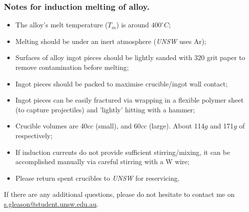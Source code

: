 \subsubsection{Notes for induction melting of \MgZnCa alloy.}
\begin{itemize}
\item The \MgZnCa alloy's melt temperature ($T_{m}$) is around $400^{\circ}C$;
\item Melting should be under an inert atmosphere (\textit{UNSW} uses Ar);
\item Surfaces of alloy ingot pieces should be lightly sanded with 320 grit paper to remove contamination before melting;
\item Ingot pieces should be packed to maximise crucible/ingot wall contact;
\item Ingot pieces can be easily fractured via wrapping in a flexible polymer sheet (to capture projectiles) and 'lightly' hitting with a hammer;
\item Crucible volumes are 40$cc$ (small), and 60$cc$ (large). About 114$g$ and 171$g$ of \MgZnCa respectively;
\item If induction currents do not provide sufficient stirring/mixing, it can be accomplished manually via careful stirring with a W wire; 
\item Please return spent crucibles to \textit{UNSW} for reservicing. 
\end{itemize}

If there are any additional questions, please do not hesitate to contact me on \href{"mailto:s.gleason@student.unsw.edu.au"}{s.gleason@student.unsw.edu.au}. 